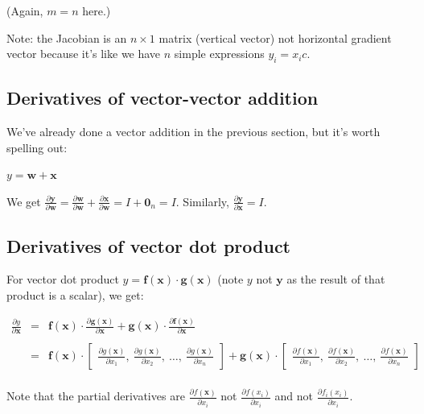\documentclass[11pt]{article}
\begin{document}
(Again, $m=n$ here.)

Note: the Jacobian is an $n \times 1$ matrix (vertical vector) not horizontal gradient vector because it's like we have $n$ simple expressions $y_i = x_i c$.


\subsection{Derivatives of vector-vector addition}

We've already done a vector addition in the previous section, but it's worth spelling out:
 
$y = \mathbf{w} + \mathbf{x}$

We get $\frac{\partial \mathbf{y}}{\partial \mathbf{w}} = \frac{\partial \mathbf{w}}{\partial \mathbf{w}} + \frac{\partial \mathbf{x}}{\partial \mathbf{w}} = I + \mathbf{0}_n = I$. Similarly, $\frac{\partial \mathbf{y}}{\partial \mathbf{x}} = I$.

\subsection{Derivatives of vector dot product}

For vector dot product $y = \mathbf{f(x)} \cdot \mathbf{g(x)}$ (note $y$ not $\mathbf{y}$ as the result of that product is a scalar), we get:

$
\begin{array}{rcl}
\frac{\partial y}{\partial \mathbf{x}} & = & \mathbf{f(x)} \cdot \frac{\partial \mathbf{g(x)}}{\partial \mathbf{x}} + \mathbf{g(x)} \cdot \frac{\partial \mathbf{f(x)}}{\partial \mathbf{x}}\\\\
 & = & \mathbf{f(x)} \cdot \begin{bmatrix} \frac{\partial g(\mathbf{x})}{\partial x_1},~ \frac{\partial g(\mathbf{x})}{\partial x_2},~ \ldots,~ \frac{\partial g(\mathbf{x})}{\partial x_n} \end{bmatrix}  + \mathbf{g(x)} \cdot \begin{bmatrix} \frac{\partial f(\mathbf{x})}{\partial x_1},~ \frac{\partial f(\mathbf{x})}{\partial x_2},~ \ldots,~ \frac{\partial f(\mathbf{x})}{\partial x_n} \end{bmatrix}\\

\end{array}
$

Note that the partial derivatives are $\frac{\partial f(\mathbf{x})}{\partial x_i}$ not $\frac{\partial f(x_i)}{\partial x_i}$ and not $\frac{\partial f_i(x_i)}{\partial x_i}$.
\end{document}
